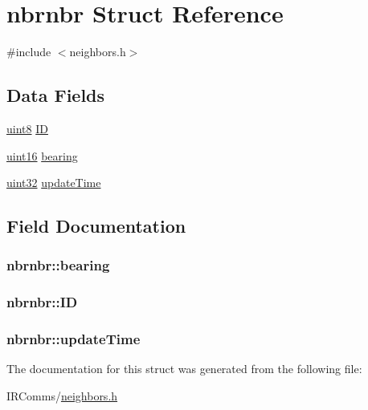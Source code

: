 \hypertarget{structnbrnbr}{
\section{nbrnbr Struct Reference}
\label{structnbrnbr}
}


{\ttfamily \#include $<$neighbors.h$>$}

\subsection*{Data Fields}
\begin{DoxyCompactItemize}
\item 
\hyperlink{typedefs_8h_adde6aaee8457bee49c2a92621fe22b79}{uint8} \hyperlink{structnbrnbr_a51fb982a18da64ef0c94e619ea4a118b}{ID}
\item 
\hyperlink{typedefs_8h_a4a2b22a29dec0305e3f9cbc69d0ff414}{uint16} \hyperlink{structnbrnbr_ab42ba548a06c24d1b7b7ee5c350c04f6}{bearing}
\item 
\hyperlink{typedefs_8h_a4b435a49c74bb91f284f075e63416cb6}{uint32} \hyperlink{structnbrnbr_a44ad15b43a7499fa8c34c0e544b75675}{updateTime}
\end{DoxyCompactItemize}


\subsection{Field Documentation}
\hypertarget{structnbrnbr_ab42ba548a06c24d1b7b7ee5c350c04f6}{
\subsubsection[{bearing}]{ {\bf nbrnbr::bearing}}}
\label{structnbrnbr_ab42ba548a06c24d1b7b7ee5c350c04f6}
\hypertarget{structnbrnbr_a51fb982a18da64ef0c94e619ea4a118b}{
\subsubsection[{ID}]{ {\bf nbrnbr::ID}}}
\label{structnbrnbr_a51fb982a18da64ef0c94e619ea4a118b}
\hypertarget{structnbrnbr_a44ad15b43a7499fa8c34c0e544b75675}{
\subsubsection[{updateTime}]{ {\bf nbrnbr::updateTime}}}
\label{structnbrnbr_a44ad15b43a7499fa8c34c0e544b75675}


The documentation for this struct was generated from the following file:\begin{DoxyCompactItemize}
\item 
IRComms/\hyperlink{neighbors_8h}{neighbors.h}\end{DoxyCompactItemize}
